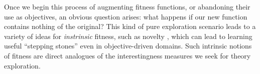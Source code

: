Once we begin this process of augmenting fitness functions, or abandoning their use as objectives, an obvious question arises: what happens if our new function contains nothing of the original? This kind of pure exploration scenario leads to a variety of ideas for \emph{instrinsic} fitness, such as novelty \citep{lehman2011abandoning}, which can lead to learning useful ``stepping stones'' even in objective-driven domains. Such intrinsic notions of fitness are direct analogues of the interestingness measures we seek for theory exploration.

\iffalse
The core problem of assigning ``interestingness'' to logical formulae is the application of statistical reasoning to the discrete, semantically-rich domain of formal systems. This problem has been tackled from various directions for a variety of reasons; here we summarise those contributions which seem of particular importance for theory exploration.
\fi
